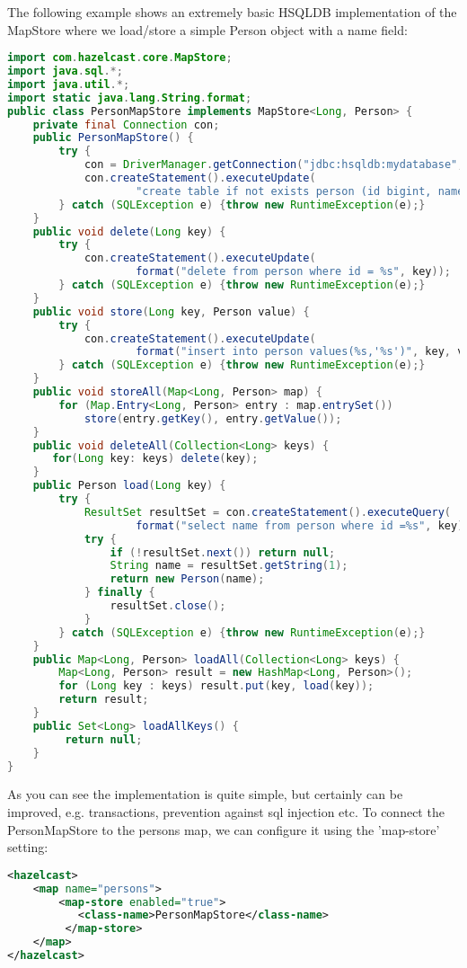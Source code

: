 The following example shows an extremely basic HSQLDB implementation of the MapStore where we load/store a simple Person object with a name field:
\begin{lstlisting}[language=java]
import com.hazelcast.core.MapStore;
import java.sql.*;
import java.util.*;
import static java.lang.String.format;
public class PersonMapStore implements MapStore<Long, Person> {
    private final Connection con;
    public PersonMapStore() {
        try {
            con = DriverManager.getConnection("jdbc:hsqldb:mydatabase", "SA", "");
            con.createStatement().executeUpdate(
                    "create table if not exists person (id bigint, name varchar(45))");
        } catch (SQLException e) {throw new RuntimeException(e);}
    }
    public void delete(Long key) {
        try {
            con.createStatement().executeUpdate(
                    format("delete from person where id = %s", key));
        } catch (SQLException e) {throw new RuntimeException(e);}
    }
    public void store(Long key, Person value) {
        try {
            con.createStatement().executeUpdate(
                    format("insert into person values(%s,'%s')", key, value.name));
        } catch (SQLException e) {throw new RuntimeException(e);}
    }
    public void storeAll(Map<Long, Person> map) {
        for (Map.Entry<Long, Person> entry : map.entrySet())
            store(entry.getKey(), entry.getValue());
    }
    public void deleteAll(Collection<Long> keys) {
       for(Long key: keys) delete(key);
    }
    public Person load(Long key) {
        try {
            ResultSet resultSet = con.createStatement().executeQuery(
                    format("select name from person where id =%s", key));
            try {
                if (!resultSet.next()) return null;
                String name = resultSet.getString(1);
                return new Person(name);
            } finally {
                resultSet.close();
            }
        } catch (SQLException e) {throw new RuntimeException(e);}
    }
    public Map<Long, Person> loadAll(Collection<Long> keys) {
        Map<Long, Person> result = new HashMap<Long, Person>();
        for (Long key : keys) result.put(key, load(key));
        return result;
    }
    public Set<Long> loadAllKeys() {
         return null;
    }
}
\end{lstlisting}
As you can see the implementation is quite simple, but certainly can be improved, e.g. transactions, prevention against sql injection etc. To connect the PersonMapStore to the persons map, we can configure it using the 'map-store' setting:
\begin{lstlisting}[language=xml]
<hazelcast>
    <map name="persons">
        <map-store enabled="true">
           <class-name>PersonMapStore</class-name>
         </map-store>
    </map>
</hazelcast>
\end{lstlisting}

